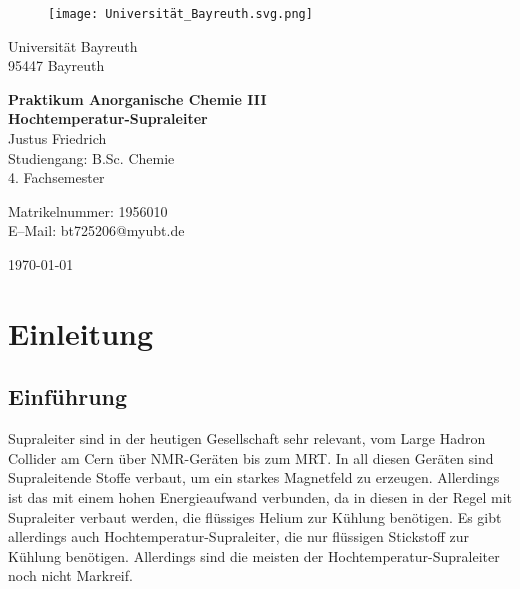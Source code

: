 \documentclass[12pt, a4paper]{article}
\begin{document}
\begin{figure}
    \texttt{[image: Universität\_Bayreuth.svg.png]}
\end{figure}



{\raggedright Universität Bayreuth\\  95447 Bayreuth}


\vspace{5cm}

\begin{center}
{\LARGE\bf{Praktikum Anorganische Chemie III}} \\  
\vspace{1cm}
{\Large\bf{Hochtemperatur-Supraleiter}}\\
\vspace{0.5cm}
{\large Justus Friedrich\\}
{Studiengang: B.Sc. Chemie\\}
{4. Fachsemester}
\end{center}





\thispagestyle{empty}
\begin{center}
{\small Matrikelnummer: 1956010 \\
E–Mail:  bt725206@myubt.de}
\end{center}

\vspace{5cm}

\begin{center}
  \today
\end{center}


\newpage
\tableofcontents
\thispagestyle{empty}


\newpage
\setcounter{page}{1}
\section{Einleitung}



\subsection{Einführung}
{Supraleiter sind in der heutigen Gesellschaft sehr relevant, vom Large Hadron Collider am Cern über NMR-Geräten bis zum MRT. 
In all diesen Geräten sind Supraleitende Stoffe verbaut, um ein starkes Magnetfeld zu erzeugen. Allerdings ist das mit einem hohen 
Energieaufwand verbunden, da in diesen in der Regel mit Supraleiter verbaut werden, die flüssiges Helium zur Kühlung 
benötigen. Es gibt allerdings auch Hochtemperatur-Supraleiter, die nur flüssigen Stickstoff zur Kühlung benötigen. Allerdings sind die 
meisten der Hochtemperatur-Supraleiter noch nicht Markreif.\cite{Buckel.2013}
}
\end{document}

